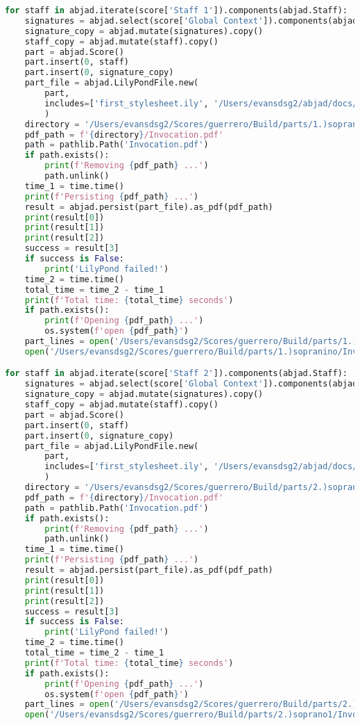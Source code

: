 \begin{lstlisting}[language=Python, caption=Invocation Source Code]
for staff in abjad.iterate(score['Staff 1']).components(abjad.Staff):
    signatures = abjad.select(score['Global Context']).components(abjad.Staff)
    signature_copy = abjad.mutate(signatures).copy()
    staff_copy = abjad.mutate(staff).copy()
    part = abjad.Score()
    part.insert(0, staff)
    part.insert(0, signature_copy)
    part_file = abjad.LilyPondFile.new(
        part,
        includes=['first_stylesheet.ily', '/Users/evansdsg2/abjad/docs/source/_stylesheets/abjad.ily'],
        )
    directory = '/Users/evansdsg2/Scores/guerrero/Build/parts/1.)sopranino'
    pdf_path = f'{directory}/Invocation.pdf'
    path = pathlib.Path('Invocation.pdf')
    if path.exists():
        print(f'Removing {pdf_path} ...')
        path.unlink()
    time_1 = time.time()
    print(f'Persisting {pdf_path} ...')
    result = abjad.persist(part_file).as_pdf(pdf_path)
    print(result[0])
    print(result[1])
    print(result[2])
    success = result[3]
    if success is False:
        print('LilyPond failed!')
    time_2 = time.time()
    total_time = time_2 - time_1
    print(f'Total time: {total_time} seconds')
    if path.exists():
        print(f'Opening {pdf_path} ...')
        os.system(f'open {pdf_path}')
    part_lines = open('/Users/evansdsg2/Scores/guerrero/Build/parts/1.)sopranino/Invocation.ly').readlines()
    open('/Users/evansdsg2/Scores/guerrero/Build/parts/1.)sopranino/Invocation.ly', 'w').writelines(part_lines[15:-1])

for staff in abjad.iterate(score['Staff 2']).components(abjad.Staff):
    signatures = abjad.select(score['Global Context']).components(abjad.Staff)
    signature_copy = abjad.mutate(signatures).copy()
    staff_copy = abjad.mutate(staff).copy()
    part = abjad.Score()
    part.insert(0, staff)
    part.insert(0, signature_copy)
    part_file = abjad.LilyPondFile.new(
        part,
        includes=['first_stylesheet.ily', '/Users/evansdsg2/abjad/docs/source/_stylesheets/abjad.ily'],
        )
    directory = '/Users/evansdsg2/Scores/guerrero/Build/parts/2.)soprano1'
    pdf_path = f'{directory}/Invocation.pdf'
    path = pathlib.Path('Invocation.pdf')
    if path.exists():
        print(f'Removing {pdf_path} ...')
        path.unlink()
    time_1 = time.time()
    print(f'Persisting {pdf_path} ...')
    result = abjad.persist(part_file).as_pdf(pdf_path)
    print(result[0])
    print(result[1])
    print(result[2])
    success = result[3]
    if success is False:
        print('LilyPond failed!')
    time_2 = time.time()
    total_time = time_2 - time_1
    print(f'Total time: {total_time} seconds')
    if path.exists():
        print(f'Opening {pdf_path} ...')
        os.system(f'open {pdf_path}')
    part_lines = open('/Users/evansdsg2/Scores/guerrero/Build/parts/2.)soprano1/Invocation.ly').readlines()
    open('/Users/evansdsg2/Scores/guerrero/Build/parts/2.)soprano1/Invocation.ly', 'w').writelines(part_lines[15:-1])


\end{lstlisting}
